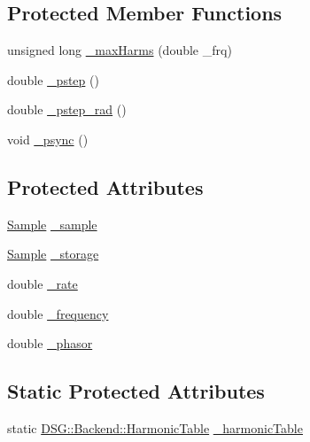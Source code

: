 \subsection*{Protected Member Functions}
\begin{DoxyCompactItemize}
\item 
unsigned long \hyperlink{classDSG_1_1FourierGenerator_a6b6e3bbad8ff7443d9ed71f4cdf76739}{\+\_\+max\+Harms} (double \+\_\+frq)
\item 
double \hyperlink{classDSG_1_1SignalGenerator_ac0d781b8673b3a283bf7c133290ede50}{\+\_\+pstep} ()
\item 
double \hyperlink{classDSG_1_1SignalGenerator_ae660eb4caa88b8d278f8d24d0908a487}{\+\_\+pstep\+\_\+rad} ()
\item 
void \hyperlink{classDSG_1_1SignalGenerator_a05baccb38d1e52860d4fcf7cb8430efc}{\+\_\+psync} ()
\end{DoxyCompactItemize}
\subsection*{Protected Attributes}
\begin{DoxyCompactItemize}
\item 
\hyperlink{classDSG_1_1Sample}{Sample} \hyperlink{classDSG_1_1FourierGenerator_ab96bed1cd59c42e82a689036e5c62bef}{\+\_\+sample}
\item 
\hyperlink{classDSG_1_1Sample}{Sample} \hyperlink{classDSG_1_1FourierGenerator_a6b7f2439b26914cc9df6b6975a2cedac}{\+\_\+storage}
\item 
double \hyperlink{classDSG_1_1SignalGenerator_aa10f6c85d9adee901139ea7fb346f39d}{\+\_\+rate}
\item 
double \hyperlink{classDSG_1_1SignalGenerator_a67e296e3506dcdf09402c667cddff9ac}{\+\_\+frequency}
\item 
double \hyperlink{classDSG_1_1SignalGenerator_ac2271b582bf699275f077ecb642a8cd9}{\+\_\+phasor}
\end{DoxyCompactItemize}
\subsection*{Static Protected Attributes}
\begin{DoxyCompactItemize}
\item 
static \hyperlink{classDSG_1_1Backend_1_1HarmonicTable}{D\+S\+G\+::\+Backend\+::\+Harmonic\+Table} \hyperlink{classDSG_1_1FourierGenerator_aedac2cf90997418836d064c90540249d}{\+\_\+harmonic\+Table}
\end{DoxyCompactItemize}


